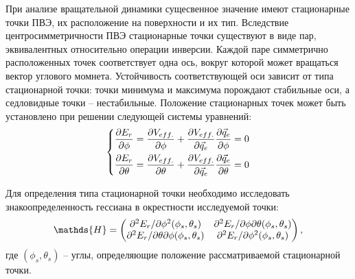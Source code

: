 При анализе вращательной динамики сущесвенное значение имеют стационарные точки ПВЭ, их расположение на поверхности и их тип. Вследствие центросимметричности ПВЭ стационарные точки существуют в виде пар, эквивалентных относительно операции инверсии. Каждой паре симметрично расположенных точек соответствует одна ось, вокруг которой может вращаться вектор углового момнета. Устойчивость соответствующей оси зависит от типа стационарной точки: точки минимума и максимума порождают стабильные оси, а седловидные точки -- нестабильные. Положение стационарных точек может быть установлено при решении следующей системы уравнений:
\vverh
\begin{gather}
\left\{
\begin{aligned}
\frac{\partial E_r}{\partial \phi} = \frac{\partial V_{eff.}}{\partial \phi} + \frac{\partial V_{eff.}}{\partial \vec{q}_e} \frac{\partial \vec{q}_e}{\partial \phi} = 0 \\
\frac{\partial E_r}{\partial \theta} = \frac{\partial V_{eff.}}{\partial \theta} + \frac{\partial V_{eff.}}{\partial \vec{q}_e} \frac{\partial \vec{q}_e}{\partial \theta} = 0
\end{aligned}
\right. \notag
\end{gather}

Для определения типа стационарной точки необходимо исследовать знакоопределенность гессиана в окрестности исследуемой точки: 
\vverh
\begin{gather}
\mathds{H} = \begin{pmatrix}
\partial^2 E_r / \partial \phi^2 (\phi_s, \theta_s) & \partial^2 E_r / \partial \phi \partial \theta (\phi_s, \theta_s) \\
\partial^2 E_r / \partial \theta \partial \phi (\phi_s, \theta_s) & \partial^2 E_r / \partial \phi^2 (\phi_s, \theta_s)
\end{pmatrix}, \notag
\end{gather}
\vlevo где $(\phi_s, \theta_s)$ -- углы, определяющие положение рассматриваемой стационарной точки.

